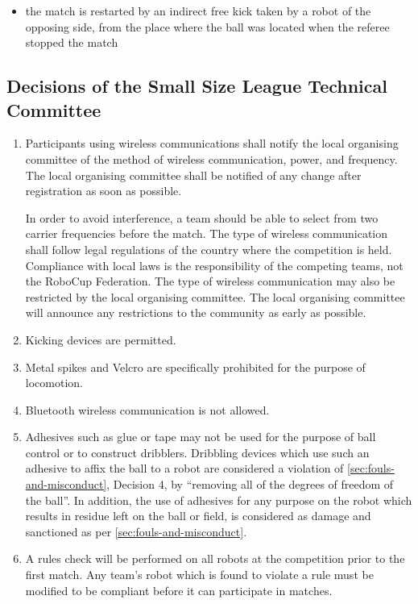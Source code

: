 \begin{itemize}
\item the match is restarted by an indirect free kick taken by a robot of the opposing side, from the place where the ball was located when the referee stopped the match
\end{itemize}

\subsection*{Decisions of the Small Size League Technical Committee}
\begin{enumerate}
\item
Participants using wireless communications shall notify the local organising committee of the method of wireless communication, power, and frequency.
The local organising committee shall be notified of any change after registration as soon as possible.

In order to avoid interference, a team should be able to select from two carrier frequencies before the match.
The type of wireless communication shall follow legal regulations of the country where the competition is held.
Compliance with local laws is the responsibility of the competing teams, not the RoboCup Federation.
The type of wireless communication may also be restricted by the local organising committee.
The local organising committee will announce any restrictions to the community as early as possible.

\item
Kicking devices are permitted.

\item
Metal spikes and Velcro are specifically prohibited for the purpose of locomotion.

\item
Bluetooth wireless communication is not allowed.

\item
Adhesives such as glue or tape may not be used for the purpose of ball control or to construct dribblers.
Dribbling devices which use such an adhesive to affix the ball to a robot are considered a violation of \autoref{sec:fouls-and-misconduct}, Decision 4, by ``removing all of the degrees of freedom of the ball''.
In addition, the use of adhesives for any purpose on the robot which results in residue left on the ball or field, is considered as damage and sanctioned as per \autoref{sec:fouls-and-misconduct}.

\item
A rules check will be performed on all robots at the competition prior to the first match.
Any team's robot which is found to violate a rule must be modified to be compliant before it can participate in matches.

\end{enumerate}
